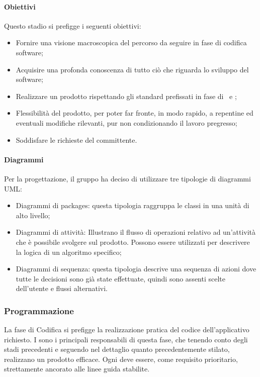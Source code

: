 		\paragraph{Obiettivi}
		Questo stadio si prefigge i seguenti obiettivi:
		\begin{itemize}
			\item Fornire una visione macroscopica del percorso da seguire in fase di codifica software;
			\item Acquisire una profonda conoscenza di tutto ciò che riguarda lo sviluppo del software;
			\item Realizzare un prodotto rispettando gli standard prefissati in fase di \SdF\ e \AdR;
			\item Flessibilità del prodotto, per poter far fronte, in modo rapido, a repentine ed eventuali modifiche rilevanti, pur non condizionando il lavoro pregresso;
			\item Soddisfare le richieste del committente.
		\end{itemize}
	\paragraph{Diagrammi}
	Per la progettazione, il gruppo ha deciso di utilizzare tre tipologie di diagrammi UML:
		\begin{itemize}
			\item Diagrammi di packages: questa tipologia raggruppa le classi in una unità di alto livello;
			\item Diagrammi di attività: Illustrano il flusso di operazioni relativo ad un'attività che è possibile svolgere sul prodotto. Possono essere utilizzati per descrivere la logica di un algoritmo specifico;
			\item Diagrammi di sequenza: questa tipologia descrive una sequenza di azioni dove tutte le decisioni sono già state effettuate, quindi sono assenti scelte dell'utente e flussi alternativi.
		\end{itemize}
	
	\subsubsection{Programmazione}
	La fase di Codifica si prefigge la realizzazione pratica del codice dell'applicativo richiesto. I \textit{\Progrs} sono i principali responsabili di questa fase, che tenendo conto degli stadi precedenti e seguendo nel dettaglio quanto precedentemente stilato, realizzano un prodotto efficace. Ogni \textit{\Progr} deve essere, come requisito prioritario, strettamente ancorato alle linee guida stabilite.
	
